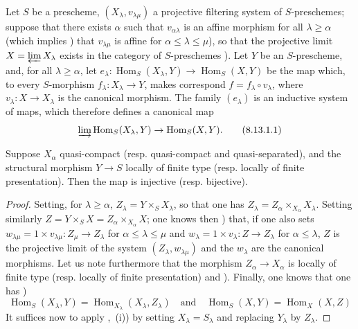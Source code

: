\begin{proposition}[8.13.1]
\label{IV.8.13.1}
Let $S$ be a prescheme, $(X_\lambda,v_{\lambda\mu})$ a projective filtering system of $S$-preschemes; suppose that there exists $\alpha$ such that $v_{\alpha\lambda}$ is an affine morphism for all $\lambda\geqslant\alpha$ (which implies ) that $v_{\lambda\mu}$ is affine for $\alpha\leqslant\lambda\leqslant\mu$), so that the projective limit $X=\varprojlim X_\lambda$ exists in the category of $S$-preschemes ).
Let $Y$ be an $S$-prescheme, and, for all $\lambda\geqslant\alpha$, let $e_\lambda:\operatorname{Hom}_S(X_\lambda,Y)\to\operatorname{Hom}_S(X,Y)$ be the map which, to every $S$-morphism $f_\lambda:X_\lambda\to Y$, makes correspond $f=f_\lambda\circ v_\lambda$, where $v_\lambda:X\to X_\lambda$ is the canonical morphism.
The family $(e_\lambda)$ is an inductive system of maps, which therefore defines a canonical map
\begin{equation}
\label{IV.8.13.1.1}
\varinjlim\operatorname{Hom}_S(X_\lambda,Y)\to\operatorname{Hom}_S(X,Y). \tag{8.13.1.1}
\end{equation}

Suppose $X_\alpha$ quasi-compact (resp. quasi-compact and quasi-separated), and the structural morphism $Y\to S$ locally of finite type (resp. locally of finite presentation).
Then the map  is injective (resp. bijective).
\end{proposition}

\begin{proof}
Setting, for $\lambda\geqslant\alpha$, $Z_\lambda=Y\times_S X_\lambda$, so that one has $Z_\lambda=Z_\alpha\times_{X_\alpha}X_\lambda$.
Setting similarly $Z=Y\times_S X=Z_\alpha\times_{X_\alpha}X$; one knows then ) that, if one also sets $w_{\lambda\mu}=1\times v_{\lambda\mu}:Z_\mu\to Z_\lambda$ for $\alpha\leqslant\lambda\leqslant\mu$ and $w_\lambda=1\times v_\lambda:Z\to Z_\lambda$ for $\alpha\leqslant\lambda$, $Z$ is the projective limit of the system $(Z_\lambda,w_{\lambda\mu})$ and the $w_\lambda$ are the canonical morphisms.
Let us note furthermore that the morphism $Z_\alpha\to X_\alpha$ is locally of finite type (resp. locally of finite presentation)  and ).
Finally, one knows that one has )
\[
\operatorname{Hom}_S(X_\lambda,Y)=\operatorname{Hom}_{X_\lambda}(X_\lambda,Z_\lambda) \quad\text{and}\quad \operatorname{Hom}_S(X,Y)=\operatorname{Hom}_X(X,Z)
\]
It suffices now to apply ,~(i)) by setting $X_\lambda=S_\lambda$ and replacing $Y_\lambda$ by $Z_\lambda$.
\end{proof}

